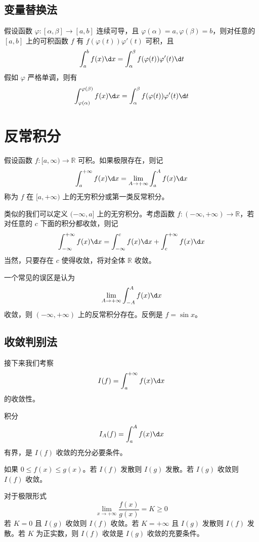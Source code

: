 \subsection{变量替换法}

\begin{theorem}
	假设函数 $\varphi : [\alpha, \beta] \to [a, b]$ 连续可导，且 $\varphi(\alpha) = a, \varphi(\beta) = b$，则对任意的 $[a, b]$ 上的可积函数 $f$ 有 $f(\varphi(t))\varphi'(t)$ 可积，且
	\[ \int_{a}^{b} f(x) \d x = \int_{\alpha}^{\beta} f(\varphi(t)) \varphi'(t) \d t \]
	假如 $\varphi$ 严格单调，则有
	\[ \int_{\varphi(\alpha)}^{\varphi(\beta)} f(x) \d x = \int_{\alpha}^{\beta} f(\varphi(t)) \varphi'(t) \d t \]

\end{theorem}

\section{反常积分}

\begin{definition}
	假设函数 $f : [a, \infty) \to \mathbb{R}$ 可积。如果极限存在，则记
	\[ \int_{a}^{+\infty} f(x) \d x = \lim_{A \to +\infty} \int_{a}^{A} f(x) \d x \]
	称为 $f$ 在 $[a, +\infty)$ 上的无穷积分或第一类反常积分。
\end{definition}

类似的我们可以定义 $(-\infty, a]$ 上的无穷积分。考虑函数 $f : (-\infty, +\infty) \to \mathbb{R}$，若对任意的 $c$ 下面的积分都收敛，则记
\[ \int_{-\infty}^{+\infty} f(x) \d x = \int_{-\infty}^{c} f(x) \d x + \int_{c}^{+\infty}f(x) \d x \]
当然，只要存在 $c$ 使得收敛，将对全体 $\mathbb{R}$ 收敛。

一个常见的误区是认为
\[ \lim_{A \to +\infty} \int_{-A}^{A} f(x) \d x \]
收敛，则 $(-\infty, +\infty)$ 上的反常积分存在。反例是 $f = \sin x$。

\subsection{收敛判别法}

接下来我们考察
\[ I(f) = \int_{a}^{+\infty} f(x) \d x \]
的收敛性。

\begin{theorem}[有界判别法]
	积分
	\[ I_A(f) = \int_{a}^{A} f(x) \d x \]
	有界，是 $I(f)$ 收敛的充分必要条件。
\end{theorem}

\begin{theorem}[比较判别法]
	如果 $0 \leqslant f(x) \leqslant g(x)$。若 $I(f)$ 发散则 $I(g)$ 发散。若 $I(g)$ 收敛则 $I(f)$ 收敛。

	对于极限形式
	\[ \lim_{x \to +\infty} \frac{f(x)}{g(x)} = K \geqslant 0 \]
	若 $K = 0$ 且 $I(g)$ 收敛则 $I(f)$ 收敛。若 $K = +\infty$ 且 $I(g)$ 发散则 $I(f)$ 发散。若 $K$ 为正实数，则 $I(f)$ 收敛是 $I(g)$ 收敛的充要条件。
\end{theorem}

